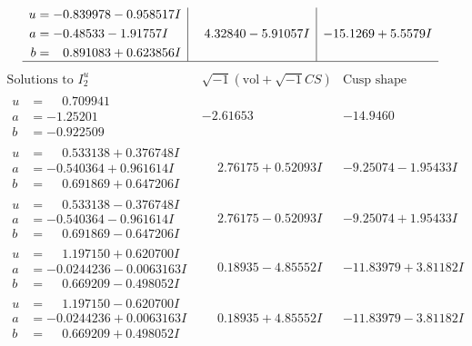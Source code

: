 \documentclass[1p]{elsarticle_modified}
\theoremstyle{definition}
\newcommand{\I}{\sqrt{-1}}
\begin{document}
$$\begin{array}{c|c|c}
\begin{aligned}
u &= -0.839978 - 0.958517 I \\
a &= -0.48533 - 1.91757 I \\
b &= \phantom{-}0.891083 + 0.623856 I\end{aligned}
 & \phantom{-}4.32840 - 5.91057 I & -15.1269 + 5.5579 I\\
 \hline 
 \end{array}$$\newpage$$\begin{array}{c|c|c}  
\text{Solutions to }I^u_{2}& \I (\text{vol} + \sqrt{-1}CS) & \text{Cusp shape}\\
 \hline 
\begin{aligned}
u &= \phantom{-}0.709941\phantom{ +0.000000I} \\
a &= -1.25201\phantom{ +0.000000I} \\
b &= -0.922509\phantom{ +0.000000I}\end{aligned}
 & -2.61653\phantom{ +0.000000I} & -14.9460\phantom{ +0.000000I} \\ \hline\begin{aligned}
u &= \phantom{-}0.533138 + 0.376748 I \\
a &= -0.540364 + 0.961614 I \\
b &= \phantom{-}0.691869 + 0.647206 I\end{aligned}
 & \phantom{-}2.76175 + 0.52093 I & -9.25074 - 1.95433 I \\ \hline\begin{aligned}
u &= \phantom{-}0.533138 - 0.376748 I \\
a &= -0.540364 - 0.961614 I \\
b &= \phantom{-}0.691869 - 0.647206 I\end{aligned}
 & \phantom{-}2.76175 - 0.52093 I & -9.25074 + 1.95433 I \\ \hline\begin{aligned}
u &= \phantom{-}1.197150 + 0.620700 I \\
a &= -0.0244236 - 0.0063163 I \\
b &= \phantom{-}0.669209 - 0.498052 I\end{aligned}
 & \phantom{-}0.18935 - 4.85552 I & -11.83979 + 3.81182 I \\ \hline\begin{aligned}
u &= \phantom{-}1.197150 - 0.620700 I \\
a &= -0.0244236 + 0.0063163 I \\
b &= \phantom{-}0.669209 + 0.498052 I\end{aligned}
 & \phantom{-}0.18935 + 4.85552 I & -11.83979 - 3.81182 I \\ \hline\begin{aligned}

\end{aligned}
\end{array}$$
\end{document}
